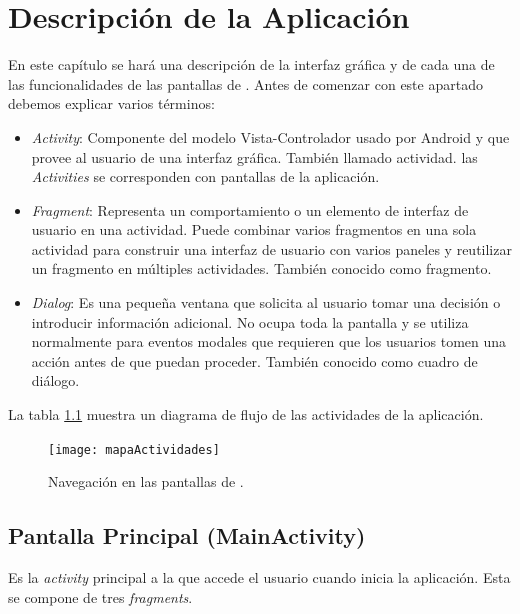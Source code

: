 %
%
%
%

\cleardoublepage
\chapter{Descripción de la Aplicación}
\label{chap:description}

	En este capítulo se hará una descripción de la interfaz gráfica y de cada una de las funcionalidades de las pantallas de \CollegeApp. Antes de comenzar con este apartado debemos explicar varios términos:
	
	\begin{itemize}
		\item {\it Activity}: Componente del modelo Vista-Controlador usado por Android y que provee al usuario de una interfaz gráfica. También llamado actividad. las {\it Activities} se corresponden con pantallas de la aplicación.
		\item {\it Fragment}: Representa un comportamiento o un elemento de interfaz de usuario en una actividad. Puede combinar varios fragmentos en una sola actividad para construir una interfaz de usuario con varios paneles y reutilizar un fragmento en múltiples actividades. También conocido como fragmento.
		\item {\it Dialog}: Es una pequeña ventana que solicita al usuario tomar una decisión o introducir información adicional. No ocupa toda la pantalla y se utiliza normalmente para eventos modales que requieren que los usuarios tomen una acción antes de que puedan proceder. También conocido como cuadro de diálogo.
	\end{itemize}
	
	La tabla \ref{fig:ActivitiesSecuence} muestra un diagrama de flujo de las actividades de la aplicación.
	
	\begin{figure}[h !]
		\centering
		\texttt{[image: mapaActividades]}
		\caption{Navegación en las pantallas de \CollegeApp.}
		\label{fig:ActivitiesSecuence}
	\end{figure}
	
	\newpage
	\section{Pantalla Principal ({\ttfamily MainActivity})}
		Es la {\it activity} principal a la que accede el usuario cuando inicia la aplicación. Esta se compone de tres {\it fragments}.
		
